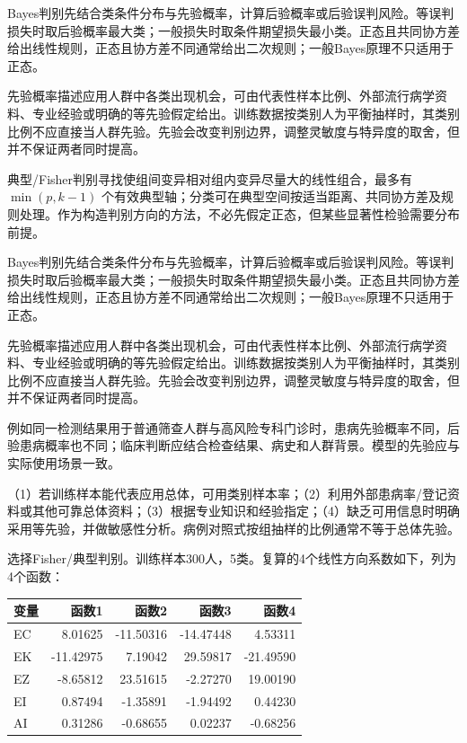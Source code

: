 Bayes判别先结合类条件分布与先验概率，计算后验概率或后验误判风险。等误判损失时取后验概率最大类；一般损失时取条件期望损失最小类。正态且共同协方差给出线性规则，正态且协方差不同通常给出二次规则；一般Bayes原理不只适用于正态。

先验概率描述应用人群中各类出现机会，可由代表性样本比例、外部流行病学资料、专业经验或明确的等先验假定给出。训练数据按类别人为平衡抽样时，其类别比例不应直接当人群先验。先验会改变判别边界，调整灵敏度与特异度的取舍，但并不保证两者同时提高。



典型/Fisher判别寻找使组间变异相对组内变异尽量大的线性组合，最多有 \(\min(p,k-1)\) 个有效典型轴；分类可在典型空间按适当距离、共同协方差及规则处理。作为构造判别方向的方法，不必先假定正态，但某些显著性检验需要分布前提。

Bayes判别先结合类条件分布与先验概率，计算后验概率或后验误判风险。等误判损失时取后验概率最大类；一般损失时取条件期望损失最小类。正态且共同协方差给出线性规则，正态且协方差不同通常给出二次规则；一般Bayes原理不只适用于正态。

先验概率描述应用人群中各类出现机会，可由代表性样本比例、外部流行病学资料、专业经验或明确的等先验假定给出。训练数据按类别人为平衡抽样时，其类别比例不应直接当人群先验。先验会改变判别边界，调整灵敏度与特异度的取舍，但并不保证两者同时提高。

例如同一检测结果用于普通筛查人群与高风险专科门诊时，患病先验概率不同，后验患病概率也不同；临床判断应结合检查结果、病史和人群背景。模型的先验应与实际使用场景一致。



（1）若训练样本能代表应用总体，可用类别样本率；（2）利用外部患病率/登记资料或其他可靠总体资料；（3）根据专业知识和经验指定；（4）缺乏可用信息时明确采用等先验，并做敏感性分析。病例对照式按组抽样的比例通常不等于总体先验。



选择Fisher/典型判别。训练样本300人，5类。复算的4个线性方向系数如下，列为4个函数：

\begin{center}\small\setlength{\tabcolsep}{4pt}\renewcommand{\arraystretch}{1.18}\begin{tabular}{@{}lrrrr@{}}
\toprule
变量 & 函数1 & 函数2 & 函数3 & 函数4 \\
\midrule

EC & 8.01625 & -11.50316 & -14.47448 & 4.53311 \\
EK & -11.42975 & 7.19042 & 29.59817 & -21.49590 \\
EZ & -8.65812 & 23.51615 & -2.27270 & 19.00190 \\
EI & 0.87494 & -1.35891 & -1.94492 & 0.44230 \\
AI & 0.31286 & -0.68655 & 0.02237 & -0.68256 \\
\bottomrule\end{tabular}\end{center}

